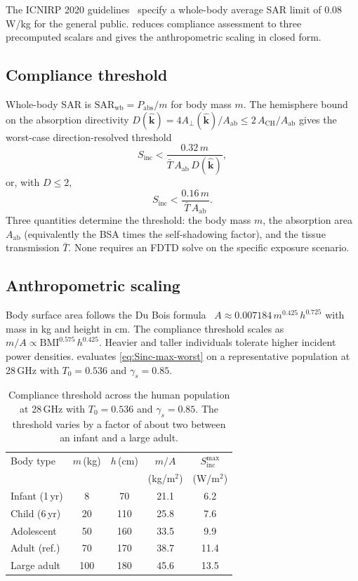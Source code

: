 \documentclass[journal,twocolumn,10pt]{IEEEtran}
\theoremstyle{plain}
\theoremstyle{remark}
\newcommand{\khat}{\hat{\bm{k}}}
\newcommand{\Sinc}{S_{\mathrm{inc}}}
\newcommand{\Aab}{A_{\mathrm{ab}}}
\newcommand{\Aperp}{A_\perp}
\newcommand{\Tbar}{\bar{T}}
\begin{document}
The ICNIRP 2020 guidelines~\cite{ICNIRP2020} specify a whole-body
average SAR limit of 0.08\,W/kg for the general public. 
reduces compliance assessment to three precomputed scalars and
gives the anthropometric scaling in closed form.

\subsection{Compliance threshold}

Whole-body SAR is $\mathrm{SAR}_{\mathrm{wb}} = P_{\mathrm{abs}}/m$
for body mass $m$. The hemisphere bound on the absorption directivity
$D(\khat) = 4\Aperp(\khat)/\Aab \leq 2\,A_{\mathrm{CH}}/\Aab$ gives
the worst-case direction-resolved threshold
\begin{equation}\label{eq:Sinc-max}
  \Sinc < \frac{0.32\,m}{\Tbar\,\Aab\,D(\khat)},
\end{equation}
or, with $D \leq 2$,
\begin{equation}\label{eq:Sinc-max-worst}
  \Sinc < \frac{0.16\,m}{\Tbar\,\Aab}.
\end{equation}
Three quantities determine the threshold: the body mass $m$, the
absorption area $\Aab$ (equivalently the BSA times the self-shadowing
factor), and the tissue transmission $\Tbar$. None requires an FDTD
solve on the specific exposure scenario.

\subsection{Anthropometric scaling}

Body surface area follows the Du Bois formula~\cite{DuBois1916}
$A \approx 0.007184\,m^{0.425}\,h^{0.725}$ with mass in kg and height
in cm. The compliance threshold scales as $m/A \propto
\mathrm{BMI}^{0.575}\,h^{0.425}$. Heavier and taller individuals
tolerate higher incident power densities.  evaluates
\eqref{eq:Sinc-max-worst} on a representative population at
28\,GHz with $T_0 = 0.536$ and $\gamma_s = 0.85$.

\begin{table}[!t]
\centering
\caption{Compliance threshold across the human population at 28\,GHz
with $T_0 = 0.536$ and $\gamma_s = 0.85$. The threshold varies by a
factor of about two between an infant and a large adult.}
\label{tab:anthro}
\small
\setlength{\tabcolsep}{3pt}
\begin{tabular}{lcccc}
\toprule
Body type & $m$\,(kg) & $h$\,(cm) & $m/A$ & $\Sinc^{\max}$ \\
& & & (kg/m$^2$) & (W/m$^2$) \\
\midrule
Infant (1\,yr) & 8   & 70  & 21.1 & 6.2 \\
Child (6\,yr)  & 20  & 110 & 25.8 & 7.6 \\
Adolescent     & 50  & 160 & 33.5 & 9.9 \\
Adult (ref.)   & 70  & 170 & 38.7 & 11.4 \\
Large adult    & 100 & 180 & 45.6 & 13.5 \\
\bottomrule
\end{tabular}
\end{table}
\end{document}
